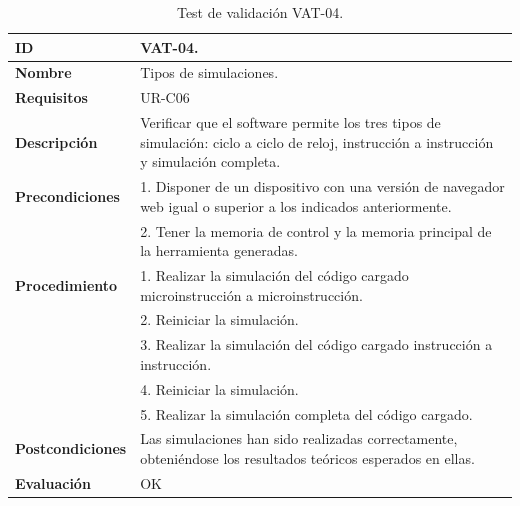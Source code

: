 \begin{center}
\begin{table}[htb]
\centering
\begin{tabular}{@{}p{2.5cm} p{9cm}@{}} 
\toprule
\textbf{ID} 					& VAT-04. \\
\midrule
\textbf{Nombre} 				& Tipos de simulaciones. \\
\midrule
\textbf{Requisitos} 		& UR-C06\\
\midrule
\textbf{Descripción} 		& Verificar que el software permite los tres tipos de simulación: ciclo a ciclo de reloj, instrucción a instrucción y simulación completa. \\
\midrule
\textbf{Precondiciones}		& 1. Disponer de un dispositivo con una versión de navegador web igual o superior a los indicados anteriormente. \\
											& 2. Tener la memoria de control y la memoria principal de la herramienta generadas. \\
\midrule
\textbf{Procedimiento}		& 1. Realizar la simulación del código cargado microinstrucción a microinstrucción.\\
											& 2. Reiniciar la simulación.\\
											& 3. Realizar la simulación del código cargado instrucción a instrucción.\\
											& 4. Reiniciar la simulación.\\
											& 5. Realizar la simulación completa del código cargado. \\
\midrule
\textbf{Postcondiciones} 		&  Las simulaciones han sido realizadas correctamente, obteniéndose los resultados teóricos esperados en ellas.\\
\midrule
\textbf{Evaluación} 			& OK \\
\bottomrule
\end{tabular}
\caption{Test de validación VAT-04.}
\label{tab:vat-04}
\end{table}
\end{center}

